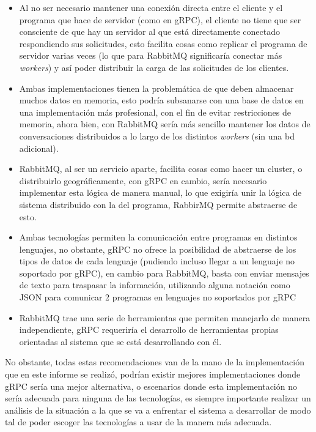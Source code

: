 \documentclass[11pt, letter]{article}
\begin{document}
\begin{itemize}
	\item Al no ser necesario mantener una conexión directa entre el cliente y el programa que hace de servidor (como en gRPC), el cliente no tiene que ser consciente de que hay un servidor al que está directamente conectado respondiendo sus solicitudes, esto facilita cosas como replicar el programa de servidor varias veces (lo que para RabbitMQ significaría conectar más \textit{workers}) y así poder distribuir la carga de las solicitudes de los clientes.
	\item Ambas implementaciones tienen la problemática de que deben almacenar muchos datos en memoria, esto podría subsanarse con una base de datos en una implementación más profesional, con el fin de evitar restricciones de memoria, ahora bien, con RabbitMQ sería más sencillo mantener los datos de conversaciones distribuidos a lo largo de los distintos \textit{workers} (sin una bd adicional).
	\item RabbitMQ, al ser un servicio aparte, facilita cosas como hacer un cluster, o distribuirlo geográficamente, con gRPC en cambio, sería necesario implementar esta lógica de manera manual, lo que exigiría unir la lógica de sistema distribuido con la del programa, RabbirMQ permite abstraerse de esto.
	\item Ambas tecnologías permiten la comunicación entre programas en distintos lenguajes, no obstante, gRPC no ofrece la posibilidad de abstraerse de los tipos de datos de cada lenguaje (pudiendo incluso llegar a un lenguaje no soportado por gRPC), en cambio para RabbitMQ, basta con enviar mensajes de texto para traspasar la información, utilizando alguna notación como JSON\cite{RFC8259} para comunicar 2 programas en lenguajes no soportados por gRPC
	\item RabbitMQ trae una serie de herramientas que permiten manejarlo de manera independiente, gRPC requeriría el desarrollo de herramientas propias orientadas al sistema que se está desarrollando con él.
\end{itemize}

No obstante, todas estas recomendaciones van de la mano de la implementación que en este informe se realizó, podrían existir mejores implementaciones donde gRPC sería una mejor alternativa, o escenarios donde esta implementación no sería adecuada para ninguna de las tecnologías, es siempre importante realizar un análisis de la situación a la que se va a enfrentar el sistema a desarrollar de modo tal de poder escoger las tecnologías a usar de la manera más adecuada.
\end{document}
